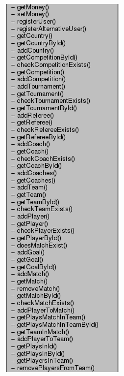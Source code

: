 \documentclass[11pt]{article}
\begin{document}
\includegraphics[scale=0.4]{UML_Database2.png}
\end{document}
